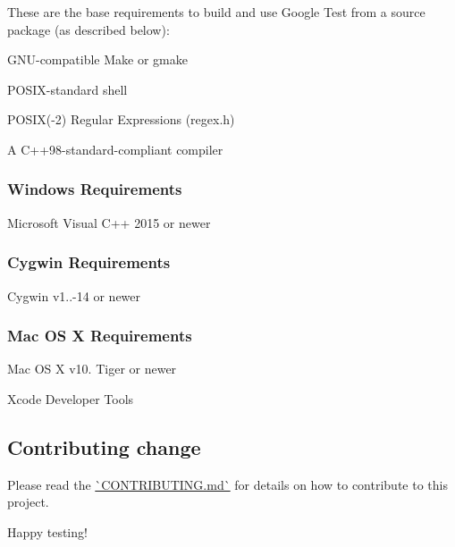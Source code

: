 These are the base requirements to build and use Google Test from a source package (as described below)\+:


\begin{DoxyItemize}
\item G\+N\+U-\/compatible Make or gmake
\item P\+O\+S\+I\+X-\/standard shell
\item P\+O\+S\+IX(-\/2) Regular Expressions (regex.\+h)
\item A C++98-\/standard-\/compliant compiler
\end{DoxyItemize}

\subsubsection*{Windows Requirements}


\begin{DoxyItemize}
\item Microsoft Visual C++ 2015 or newer
\end{DoxyItemize}

\subsubsection*{Cygwin Requirements}


\begin{DoxyItemize}
\item Cygwin v1..-\/14 or newer
\end{DoxyItemize}

\subsubsection*{Mac OS X Requirements}


\begin{DoxyItemize}
\item Mac OS X v10. Tiger or newer
\item Xcode Developer Tools
\end{DoxyItemize}

\subsection*{Contributing change}

Please read the \mbox{\hyperlink{md_CONTRIBUTING}{\`{}\+C\+O\+N\+T\+R\+I\+B\+U\+T\+I\+NG.md\`{}}} for details on how to contribute to this project.

Happy testing! 